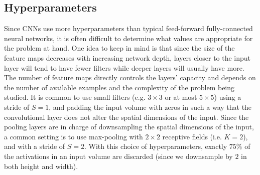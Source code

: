 \documentclass[../main.tex]{subfiles}
\begin{document}
\subsection{Hyperparameters}%
\label{subsec:ml_cnn_hyperparameters}
Since CNNs use more hyperparameters than typical feed-forward fully-connected
neural networks, it is often difficult to determine what values are appropriate
for the problem at hand.
%
One idea to keep in mind is that since the size of the feature maps decreases
with increasing network depth, layers closer to the input layer will tend to
have fewer filters while deeper layers will usually have more.
%
The number of feature maps directly controls the layers' capacity and depends
on the number of available examples and the complexity of the problem being
studied.
%
It is common to use small filters (e.g. $3\times3$ or at most $5\times5$) using
a stride of $S=1$, and padding the input volume with zeros in such a way that
the convolutional layer does not alter the spatial dimensions of the input.
%
Since the pooling layers are in charge of downsampling the spatial dimensions
of the input, a common setting is to use max-pooling with $2\times2$ receptive
fields (i.e. $K = 2$), and with a stride of $S = 2$.
%
With this choice of hyperparameters, exactly $75\%$ of the activations in an
input volume are discarded (since we downsample by $2$ in both height and
width).
%
%
%
\end{document}
